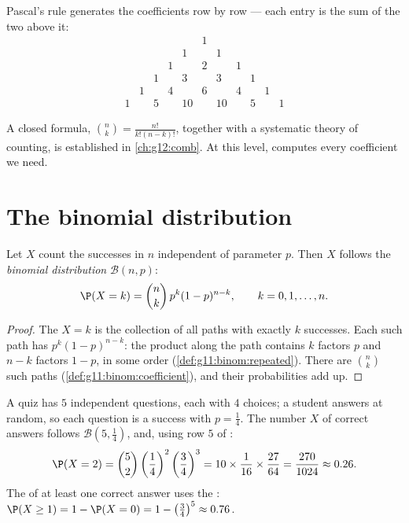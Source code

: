 Pascal's rule generates the coefficients row by row --- each entry is the
sum of the two above it:
\[
\begin{array}{ccccccccccc}
&&&&&1&&&&&\\
&&&&1&&1&&&&\\
&&&1&&2&&1&&&\\
&&1&&3&&3&&1&&\\
&1&&4&&6&&4&&1&\\
1&&5&&10&&10&&5&&1
\end{array}
\]

\begin{remark}
A closed formula, $\binom nk = \frac{n!}{k!(n-k)!}$, together with a
systematic theory of counting, is established in \cref{ch:g12:comb}. At
this level,  computes every coefficient we need.
\end{remark}

\section{The binomial distribution}

\begin{theorem}\label{thm:g11:binom:binomial}
Let $X$ count the successes in $n$ independent  of
parameter $p$. Then $X$ follows the \emph{binomial
distribution} $\mathcal B(n, p)$:
\[
\P(X = k) = \binom{n}{k}\, p^k (1-p)^{n-k},
\qquad k = 0, 1, \dots, n .
\]
\end{theorem}

\begin{proof}
The  $X = k$ is the collection of all paths with exactly $k$
successes. Each such path has  $p^k(1-p)^{n-k}$: the product
along the path contains $k$ factors $p$ and $n - k$ factors $1-p$, in
some order (\cref{def:g11:binom:repeated}). There are $\binom nk$ such
paths (\cref{def:g11:binom:coefficient}), and their probabilities add up.
\end{proof}

\begin{example}\label{ex:g11:binom:quiz}
A quiz has $5$ independent questions, each with $4$ choices; a student
answers at random, so each question is a success with $p = \frac14$. The
number $X$ of correct answers follows $\mathcal B\left(5, \frac14\right)$,
and, using row $5$ of :
\[
\P(X = 2) = \binom52 \left(\frac14\right)^2\left(\frac34\right)^3
= 10 \times \frac{1}{16} \times \frac{27}{64}
= \frac{270}{1024} \approx 0.26 .
\]
The  of at least one correct answer uses the :
$\P(X \geq 1) = 1 - \P(X = 0) = 1 - \left(\frac34\right)^5 \approx
0.76$.
\end{example}


